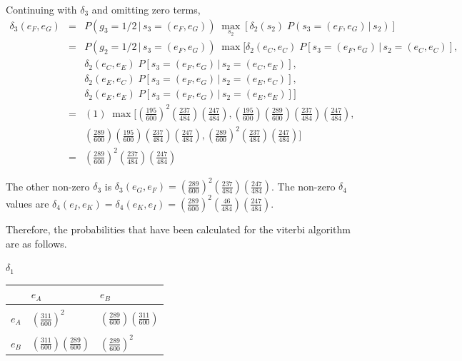 \documentclass[a4paper,11pt,twoside,abstraction,titlepage]{article}
\begin{document}
\vspace{10pt}
\noindent Continuing with $\delta_3$ and omitting zero terms,
\begin{eqnarray*}
\delta_3(e_F,e_G) &=& P(g_3=1/2\,|\,s_3=(e_F,e_G)) \; \max_{s_2} \left[\delta_2(s_2) \; P(s_3=(e_F,e_G)\,|\,s_2) \right]\\
&=& P(g_2=1/2\,|\,s_3=(e_F,e_G)) \;  \max [ \delta_2(e_C,e_C) \; P[s_3=(e_F,e_G) \,  | \, s_2 = (e_C,e_C)], \\
&&\delta_2(e_C,e_E) \; P[s_3=(e_F,e_G) \,  | \, s_2 = (e_C,e_E)],\\
&&\delta_2(e_E,e_C) \; P[s_3=(e_F,e_G) \,  | \, s_2 = (e_E,e_C)],\\
&&\delta_2(e_E,e_E)\; P[s_3=(e_F,e_G) \,  | \, s_2 = (e_E,e_E)] ] \\
&=& (1) \; \max \bigg[\left( \frac{195}{600} \right)^2 \!\! \left(\frac{237}{484}\right) \!\! \left(\frac{247}{484}\right), \left( \frac{195}{600} \right) \!\! \left(\frac{289}{600}\right) \!\! \left(\frac{237}{484}\right)\!\! \left(\frac{247}{484}\right), \\
&&\left( \frac{289}{600} \right) \!\! \left(\frac{195}{600}\right) \!\! \left(\frac{237}{484}\right)\!\! \left(\frac{247}{484}\right), \left( \frac{289}{600} \right)^2 \!\! \left(\frac{237}{484}\right) \!\! \left(\frac{247}{484}\right) \bigg]\\
&=&  \left( \frac{289}{600} \right)^2 \!\! \left(\frac{237}{484}\right) \!\! \left(\frac{247}{484}\right)
\end{eqnarray*}

\noindent The other non-zero $\delta_3$ is $\delta_3(e_G,e_F) = \left( \frac{289}{600} \right)^2 \! \left(\frac{237}{484}\right) \!\! \left(\frac{247}{484}\right)$.  The non-zero $\delta_4$ values are $\delta_4(e_I,e_K) = \delta_4(e_K,e_I) = \left( \frac{289}{600} \right)^2 \! \left(\frac{46}{484}\right) \!\! \left(\frac{247}{484}\right)$.

Therefore, the probabilities that have been calculated for the viterbi algorithm are as follows.

\vspace{15pt}

\noindent $\delta_1$
\begin{center}
\begin{tabular}{ c | >{\centering\arraybackslash}m{1.6cm} >{\centering\arraybackslash}m{1.6cm} }
 & $e_A$ & $e_B$\\[5pt]
\hline \\[-5pt]
$e_A$ & $\left(\frac{311}{600}\right)^2$ & $\left(\frac{289}{600}\right) \!\!\left(\frac{311}{600}\right)$ \\ \\[-5pt]
$e_B$ & $\left(\frac{311}{600}\right) \!\!\left(\frac{289}{600}\right)$ &$ \left(\frac{289}{600}\right)^2 $ \\[5pt]
\end{tabular}
\end{center}
\end{document}
